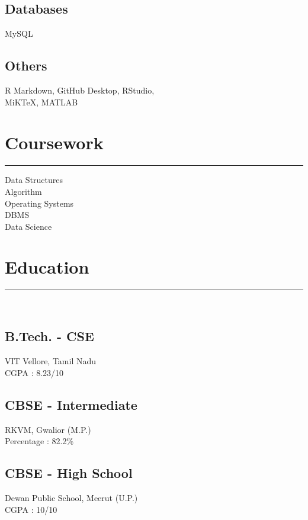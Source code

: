 \documentclass[]{meetresume-class}
\begin{document}
\begin{minipage}[t]{0.33\textwidth}
		\subsection{Databases}
		MySQL%
		\vspace{6pt}
		
		\subsection{Others}
		R Markdown, GitHub Desktop, RStudio,\\
		MiKTeX, MATLAB
		\sectionsep
		\section{Coursework}
		\noindent\rule{5cm}{0.6pt}
		
		Data Structures\\
		Algorithm\\
		Operating Systems\\
		DBMS\\
		Data Science
		\sectionsep
		\section{Education} 
		\noindent\rule{5cm}{0.6pt}\\
		\subsection{B.Tech. - CSE}
		VIT Vellore, Tamil Nadu \\
		CGPA : 8.23/10\\
		\vspace{8pt}
		\subsection{CBSE - Intermediate}
		RKVM, Gwalior (M.P.)\\
		Percentage : 82.2\%\\
		\vspace{8pt}
		\subsection{CBSE - High School}
		Dewan Public School, Meerut (U.P.)\\
		CGPA : 10/10
		\sectionsep

\end{minipage}
\end{document}
